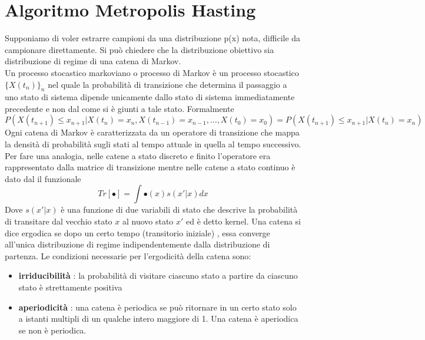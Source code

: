 \chapter{Algoritmo Metropolis Hasting}
Supponiamo di voler estrarre campioni da una distribuzione p(x) nota, difficile da
campionare direttamente.
Si può  chiedere che la distribuzione obiettivo sia
distribuzione di regime di una catena di Markov.\\ 
Un processo stocastico markoviano o processo di Markov è un processo stocastico $\{X(t_n)\}_n$ nel quale la probabilità di transizione che determina il passaggio a uno stato di sistema dipende unicamente dallo stato di sistema immediatamente precedente e non dal come si è giunti a tale stato. Formalmente
\begin{equation}
P(X(t_{n+1})\leq x_{n+1}|X(t_n)= x_n, X(t_{n-1})= x_{n-1}, \ldots, X(t_0)= x_0) = P(X(t_{n+1})\leq x_{n+1}|X(t_n)=x_n)
\end{equation}
Ogni catena di Markov è caratterizzata da un operatore di transizione che mappa la densità di probabilità sugli stati al tempo attuale in quella al tempo successivo. Per fare una analogia, nelle catene a stato discreto e finito l'operatore era  rappresentato dalla matrice di transizione mentre nelle catene a stato continuo è dato dal il funzionale
\begin{equation}
Tr[\bullet]=\int \bullet(x)s(x'|x)dx
\end{equation}
Dove $s(x'|x)$ è una funzione di due variabili di stato che descrive la probabilità di transitare dal vecchio stato $x$ al nuovo stato $x'$ ed è detto kernel.
 Una catena si dice ergodica se
dopo un certo tempo (transitorio iniziale) , essa converge all'unica distribuzione
di regime indipendentemente dalla distribuzione di partenza.
Le condizioni necessarie per l’ergodicità   della catena sono:
\begin{itemize}
\item \textbf{irriducibilità} : la probabilità   di visitare ciascuno stato a partire da ciascuno
stato è   strettamente positiva
\item \textbf{aperiodicità} : una catena è periodica se può  ritornare in un certo stato solo
a istanti multipli di un qualche intero maggiore di 1. Una catena è   aperiodica
se non è   periodica.
\end{itemize}

